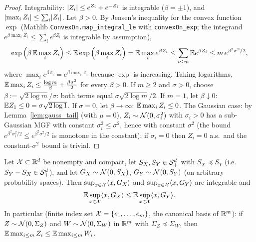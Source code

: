 \begin{proof}
\leanok
{}
Integrability: $\lvert Z_i \rvert\le e^{Z_i} + e^{-Z_i}$ is integrable ($\beta = \pm1$), and
$\lvert \max_iZ_i \rvert \le \sum_i\lvert Z_i \rvert$. Let $\beta > 0$. By Jensen's inequality for the convex
function $\exp$ (Mathlib \texttt{ConvexOn.map\_integral\_le} with \texttt{convexOn\_exp}; the
integrand $e^{\beta\max_iZ_i} \le \sum_ie^{\beta Z_i}$ is integrable by assumption),
\[
  \exp\Big(\beta\,\mathbb{E}\max_iZ_i\Big) \le \mathbb{E}\exp\Big(\beta\max_iZ_i\Big)
  = \mathbb{E}\max_i e^{\beta Z_i} \le \sum_{i\le m}\mathbb{E} e^{\beta Z_i}
  \le m\,e^{\beta^2\sigma^2/2},
\]
where $\max_ie^{\beta Z_i} = e^{\beta\max_iZ_i}$ because $\exp$ is increasing. Taking
logarithms, $\mathbb{E}\max_iZ_i \le \frac{\log m}{\beta} + \frac{\beta\sigma^2}{2}$ for every
$\beta>0$. If $m\ge2$ and $\sigma>0$, choose $\beta := \sqrt{2\log m}/\sigma$: both terms
equal $\sigma\sqrt{2\log m}/2$. If $m = 1$, let $\beta\downarrow0$: $\mathbb{E} Z_1\le0 = \sigma\sqrt{2\log1}$.
If $\sigma = 0$, let $\beta\to\infty$: $\mathbb{E}\max_iZ_i\le0$. The Gaussian case: by
Lemma~\ref{lem:gauss_tail} (with $\mu = 0$), $Z_i\sim\mathcal{N}(0,\sigma_i^2)$ with $\sigma_i>0$
has a sub-Gaussian MGF with constant $\sigma_i^2\le\sigma^2$, hence with constant $\sigma^2$
(the bound $e^{\beta^2\sigma_i^2/2}\le e^{\beta^2\sigma^2/2}$ is monotone in the constant);
if $\sigma_i = 0$ then $Z_i = 0$ a.s.\ and the constant-$\sigma^2$ bound is trivial.
\end{proof}

\begin{lemma}\label{lem:gauss_comparison}
\leanok
{}
Let $\mathcal{X} \subset \mathbb{R}^d$ be nonempty and compact, let $S_X, S_Y \in \mathcal{S}_{+}^{d}$ with
$S_X \preceq S_Y$ (i.e.\ $S_Y - S_X \in \mathcal{S}_{+}^{d}$), and let $G_X \sim \mathcal{N}(0,S_X)$,
$G_Y \sim \mathcal{N}(0,S_Y)$ (on arbitrary probability spaces). Then
$\sup_{x\in\mathcal{X}}\langle x, G_X \rangle$ and $\sup_{x\in\mathcal{X}}\langle x, G_Y \rangle$ are integrable and
\[
  \mathbb{E}\sup_{x\in\mathcal{X}}\langle x, G_X \rangle \le \mathbb{E}\sup_{x\in\mathcal{X}}\langle x, G_Y \rangle.
\]
In particular (finite index set $\mathcal{X} = \{e_1,\dots,e_m\}$, the canonical basis of $\mathbb{R}^m$):
if $Z \sim \mathcal{N}(0,\Sigma_Z)$ and $W \sim \mathcal{N}(0,\Sigma_W)$ in $\mathbb{R}^m$ with
$\Sigma_Z \preceq \Sigma_W$, then $\mathbb{E}\max_{i\le m}Z_i \le \mathbb{E}\max_{i\le m}W_i$.
\end{lemma}

